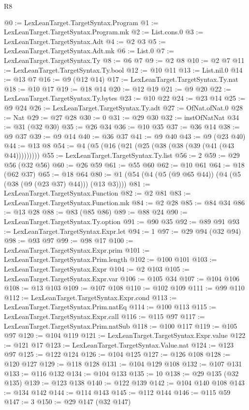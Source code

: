 \begin{lexlean}{R8}
\begin{coremodule}
@0 := LexLeanTarget.TargetSyntax.Program
@1 := LexLeanTarget.TargetSyntax.Program.mk
@2 := List.cons.{0}
@3 := LexLeanTarget.TargetSyntax.Adt
@4 := @2 @3
@5 := LexLeanTarget.TargetSyntax.Adt.mk
@6 := List.{0}
@7 := LexLeanTarget.TargetSyntax.Ty
@8 := @6 @7
@9 := @2 @8
@10 := @2 @7
@11 := LexLeanTarget.TargetSyntax.Ty.bool
@12 := @10 @11
@13 := List.nil.{0}
@14 := @13 @7
@16 := @9 (@12 @14)
@17 := LexLeanTarget.TargetSyntax.Ty.nat
@18 := @10 @17
@19 := @18 @14
@20 := @12 @19
@21 := @9 @20
@22 := LexLeanTarget.TargetSyntax.Ty.bytes
@23 := @10 @22
@24 := @23 @14
@25 := @9 @24
@26 := LexLeanTarget.TargetSyntax.Ty.adt
@27 := OfNat.ofNat.{0}
@28 := Nat
@29 := @27 @28
@30 := 0
@31 := @29 @30
@32 := instOfNatNat
@34 := @31 (@32 @30)
@35 := @26 @34
@36 := @10 @35
@37 := @36 @14
@38 := @9 @37
@39 := @9 @14
@40 := @36 @37
@41 := @9 @40
@43 := @9 (@23 @40)
@44 := @13 @8
@54 := @4 (@5 (@16 (@21 (@25 (@38 (@38 (@39 (@41 (@43 @44)))))))))
@55 := LexLeanTarget.TargetSyntax.Ty.list
@56 := 2
@59 := @29 @56 (@32 @56)
@60 := @26 @59
@61 := @55 @60
@62 := @10 @61
@64 := @18 (@62 @37)
@65 := @18 @64
@80 := @1 (@54 (@4 (@5 (@9 @65 @44)) (@4 (@5 (@38 (@9 (@23 @37) @44))) (@13 @3))))
@81 := LexLeanTarget.TargetSyntax.Function
@82 := @2 @81
@83 := LexLeanTarget.TargetSyntax.Function.mk
@84 := @2 @28
@85 := @84 @34
@86 := @13 @28
@88 := @83 (@85 @86)
@89 := @88 @24
@90 := LexLeanTarget.TargetSyntax.Ty.option
@91 := @90 @35
@92 := @89 @91
@93 := LexLeanTarget.TargetSyntax.Expr.let
@94 := 1
@97 := @29 @94 (@32 @94)
@98 := @93 @97
@99 := @98 @17
@100 := LexLeanTarget.TargetSyntax.Expr.prim
@101 := LexLeanTarget.TargetSyntax.Prim.length
@102 := @100 @101
@103 := LexLeanTarget.TargetSyntax.Expr
@104 := @2 @103
@105 := LexLeanTarget.TargetSyntax.Expr.var
@106 := @105 @34
@107 := @104 @106
@108 := @13 @103
@109 := @107 @108
@110 := @102 @109
@111 := @99 @110
@112 := LexLeanTarget.TargetSyntax.Expr.cond
@113 := LexLeanTarget.TargetSyntax.Prim.natEq
@114 := @100 @113
@115 := LexLeanTarget.TargetSyntax.Expr.call
@116 := @115 @97
@117 := LexLeanTarget.TargetSyntax.Prim.natSub
@118 := @100 @117
@119 := @105 @97
@120 := @104 @119
@121 := LexLeanTarget.TargetSyntax.Expr.value
@122 := @121 @17
@123 := LexLeanTarget.TargetSyntax.Value.nat
@124 := @123 @97
@125 := @122 @124
@126 := @104 @125
@127 := @126 @108
@128 := @120 @127
@129 := @118 @128
@131 := @104 @129 @108
@132 := @107 @131
@133 := @116 @132
@134 := @104 @133
@135 := 10
@138 := @29 @135 (@32 @135)
@139 := @123 @138
@140 := @122 @139
@142 := @104 @140 @108
@143 := @134 @142
@144 := @114 @143
@145 := @112 @144
@146 := @115 @59
@147 := 3
@150 := @29 @147 (@32 @147)

\end{coremodule}
\end{lexlean}
